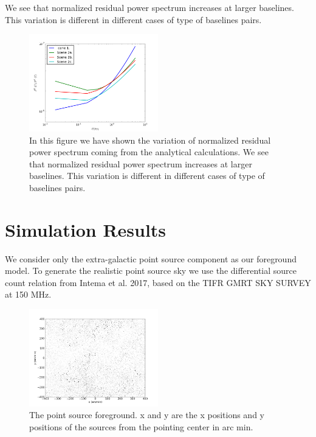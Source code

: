 \documentclass[fleqn,usenatbib]{mnras}
\begin{document}
 We see that normalized residual power spectrum increases at larger baselines. This variation is different in different cases of type of baselines pairs. 
\begin{figure}
    \centering
    \includegraphics[width=0.5\textwidth]{ResPow_vsU_Nu.png}
    \caption{In this figure we have shown the variation of normalized residual power spectrum coming from the analytical calculations. We see that normalized residual power spectrum increases at larger baselines. This variation is different in different cases of type of baselines pairs. }
    \label{fig:Figure 3}
\end{figure}

\section{Simulation Results}
We consider only the extra-galactic point source component as our foreground model. To generate the realistic point source sky we use the differential source count relation from Intema et al. 2017, based on the TIFR GMRT SKY SURVEY at 150 MHz.
\begin{figure}
    \centering
    \includegraphics[width=0.5\textwidth]{cluster_sky.png}
    \caption{The point source foreground. x and y are the x positions and y positions of the sources from the pointing center in arc min.}
    \label{fig:my_label}
\end{figure}
\end{document}
